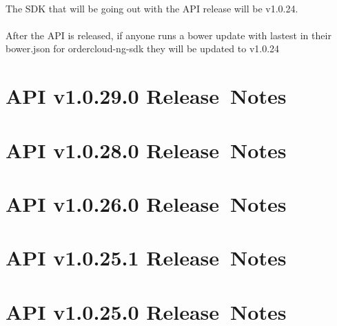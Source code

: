 \documentclass{memoir}%
\begin{document}
%
\paragraph*{}%
The SDK that will be going out with the API release will be v1.0.24.

%
\paragraph*{}%
After the API is released, if anyone runs a bower update with lastest in their bower.json for ordercloud{-}ng{-}sdk they will be updated to v1.0.24

%
\section*{API v1.0.29.0 Release~Notes}%
\paragraph*{}%

%
\section*{API v1.0.28.0 Release~Notes}%
\paragraph*{}%

%
\section*{API v1.0.26.0 Release~Notes}%
\paragraph*{}%

%
\section*{API v1.0.25.1 Release~Notes}%
\paragraph*{}%

%
\section*{API v1.0.25.0 Release~Notes}%
\paragraph*{}%
\end{document}

